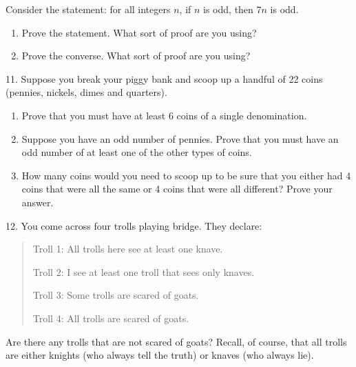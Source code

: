 \documentclass[10pt,]{book}
\theoremstyle{plain}
\theoremstyle{definition}
\numberwithin{equation}{chapter}
\begin{document}
\begin{exerciselist}
        Consider the statement: for all integers \(n\), if \(n\) is odd, then \(7n\) is odd.
\leavevmode%
\begin{enumerate}[label=(\alph*)]
\item\hypertarget{li-755}{}
            Prove the statement. What sort of proof are you using?
\item\hypertarget{li-756}{}
            Prove the converse. What sort of proof are you using?
\end{enumerate}
\par\smallskip
\item[11.]\hypertarget{exercise-272}{}
        Suppose you break your piggy bank and scoop up a handful of 22 coins (pennies, nickels, dimes and quarters).
\leavevmode%
\begin{enumerate}[label=(\alph*)]
\item\hypertarget{li-759}{}
            Prove that you must have at least 6 coins of a single denomination.
\item\hypertarget{li-760}{}
            Suppose you have an odd number of pennies. Prove that you must have an odd number of at least one of the other types of coins.
\item\hypertarget{li-761}{}
            How many coins would you need to scoop up to be sure that you either had 4 coins that were all the same or 4 coins that were all different? Prove your answer.
\end{enumerate}
\par\smallskip
\item[12.]\hypertarget{exercise-273}{} You come across four trolls playing bridge.  They declare:
        \begin{quote}Troll 1: All trolls here see at least one knave.%
\par
Troll 2: I see at least one troll that sees only knaves.%
\par
Troll 3: Some trolls are scared of goats.%
\par

        Troll 4: All trolls are scared of goats.
\end{quote}

      Are there any trolls that are not scared of goats?  Recall, of course, that all trolls are either knights (who always tell the truth) or knaves (who always lie).%
\par\smallskip
\end{exerciselist}
\typeout{************************************************}
\typeout{************************************************}
\end{document}
